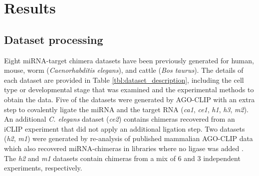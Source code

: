 \chapter{Results}
\label{chap:results}

\section{Dataset processing}
Eight miRNA-target chimera datasets have been previously generated for human, mouse, worm (\textit{Caenorhabditis elegans}), and cattle (\textit{Bos taurus}).
The details of each dataset are provided in Table \ref{tbl:dataset_description}, including the cell type or developmental stage that was examined and the experimental methods to obtain the data. Five of the datasets were generated by AGO-CLIP with an extra step to covalently ligate the miRNA and the target RNA (\textit{ca1}, \textit{ce1}, \textit{h1},  \textit{h3}, \textit{m2}). An additional \textit{C. elegans} dataset (\textit{ce2}) contains chimeras recovered from an iCLIP experiment that did not apply an additional ligation step. Two datasets (\textit{h2}, \textit{m1}) were generated by re-analysis of published mammalian AGO-CLIP data which also recovered miRNA-chimeras in libraries where no ligase was added \cite{grosswendt2014unambiguous}. The \textit{h2} and \textit{m1} datasets contain chimeras from a mix of 6 and 3 independent experiments, respectively.


